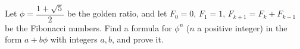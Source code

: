 Let $\phi=\dfrac{1+\sqrt5}{2}$ be the golden ratio, and let $F_0=0$, $F_1=1$, $F_{k+1}=F_k+F_{k-1}$ be the Fibonacci numbers. Find a formula for $\phi^n$ ($n$ a positive integer) in the form $a+b\phi$ with integers $a,b$, and prove it.
